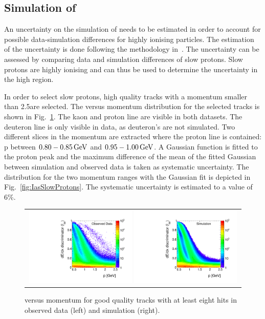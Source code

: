 \subsection*{Simulation of \ias}
An uncertainty on the simulation of \ias needs to be estimated in order to account for possible data-simulation differences for highly ionising particles.
The estimation of the \ias uncertainty is done following the methodology in~\cite{bib:CMS:HSCP_8TeV,bib:CMS:HSCP_8TeV_AN}.
The \ias uncertainty can be assessed by comparing data and simulation differences of slow protons.
Slow protons are highly ionising and can thus be used to determine the uncertainty in the high \ias region.

In order to select slow protons, high quality tracks with a momentum smaller than 2.5\gev are selected.
The \ias versus momentum distribution for the selected tracks is shown in Fig.~\ref{fig:IasVsMomentum}.
The kaon and proton line are visible in both datasets. 
The deuteron line is only visible in data, as deuteron's are not simulated.
Two different slices in the momentum are extracted where the proton line is contained: p between $0.80-0.85\,\text{Ge}\kern-0.06667em\text{V}$ and $0.95-1.00\,\text{Ge}\kern-0.06667em\text{V}$.
A Gaussian function is fitted to the proton peak and the maximum difference of the mean of the fitted Gaussian between simulation and observed data is taken as systematic uncertainty.
The \ias distribution for the two momentum ranges with the Gaussian fit is depicted in Fig.~\ref{fig:IasSlowProtons}.
The systematic uncertainty is estimated to a value of 6\%.
\begin{figure}[!h]
  \centering 
  \begin{tabular}{c}
    \includegraphics[width=0.49\textwidth]{figures/analysis/Interpretation/IasP_Data.pdf} 
    \includegraphics[width=0.49\textwidth]{figures/analysis/Interpretation/IasP_MC.pdf}
  \end{tabular}
  \caption{\ias versus momentum for good quality tracks with at least eight hits in observed data (left) and simulation (right).}
  \label{fig:IasVsMomentum}
\end{figure} 

